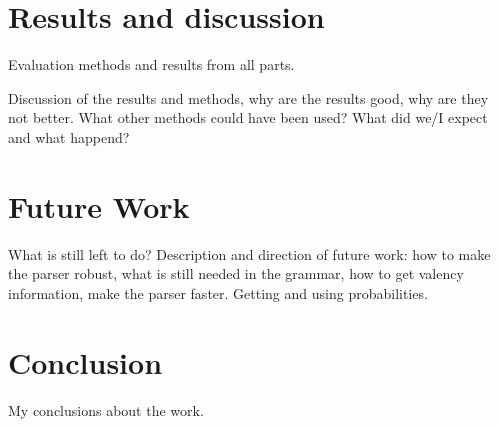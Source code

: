 \documentclass{article}
\begin{document}
\section{Results and discussion}
Evaluation methods and results from all parts. 

Discussion of the results and methods, why are the results good, why are they not better.
What other methods could have been used? What did we/I expect and what happend?


\section{Future Work}
What is still left to do? Description and direction of future work:
how to make the parser robust, what is still needed in the grammar, 
how to get valency information, make the parser faster.
Getting and using probabilities.


\section{Conclusion}
My conclusions about the work.
\end{document}
